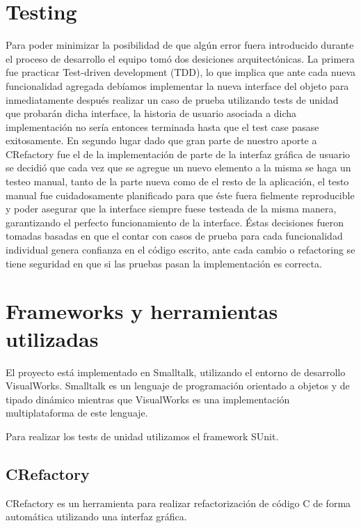 \documentclass[a4paper,oneside,12pt]{article}
\begin{document}
\section{Testing}
\label{sec:testing}
Para poder minimizar la posibilidad de que alg\'un error fuera introducido durante el proceso de desarrollo el equipo tom\'o dos desiciones arquitect\'onicas. La primera fue practicar Test-driven development (TDD), lo que implica que ante cada nueva funcionalidad agregada deb\'iamos implementar la  nueva interface del objeto para inmediatamente despu\'es realizar un caso de prueba utilizando tests de unidad que probar\'an dicha interface, la historia de usuario asociada a dicha implementaci\'on no ser\'ia entonces terminada hasta que el test case pasase exitosamente. En segundo lugar dado que gran parte de nuestro aporte a CRefactory fue el de la implementaci\'on de parte de la interfaz gr\'afica de usuario se decidi\'o que cada vez que se agregue un nuevo elemento a la misma se haga un testeo manual, tanto de la parte nueva como de el resto de la aplicaci\'on, el testo manual fue cuidadosamente planificado para que \'este fuera fielmente reproducible y poder asegurar que la interface siempre fuese testeada de la misma manera, garantizando el perfecto funcionamiento de la interface.
\'Estas decisiones fueron tomadas basadas en que el contar con casos de prueba para cada funcionalidad individual genera confianza en el c\'odigo escrito, ante cada cambio o refactoring se tiene seguridad en que si las pruebas pasan la implementaci\'on es correcta.


\section{Frameworks y herramientas utilizadas}
\label{sec:frameworks_and_tools}
El proyecto est\'a implementado en Smalltalk, utilizando el entorno de desarrollo VisualWorks. Smalltalk es un lenguaje de programaci\'on orientado a objetos y de tipado din\'amico mientras que VisualWorks es una implementaci\'on multiplataforma de este lenguaje.

Para realizar los tests de unidad utilizamos el framework SUnit.

\subsection{CRefactory}
CRefactory es un herramienta para realizar refactorizaci\'on de c\'odigo C de forma autom\'atica utilizando una interfaz gr\'afica.
\end{document}
